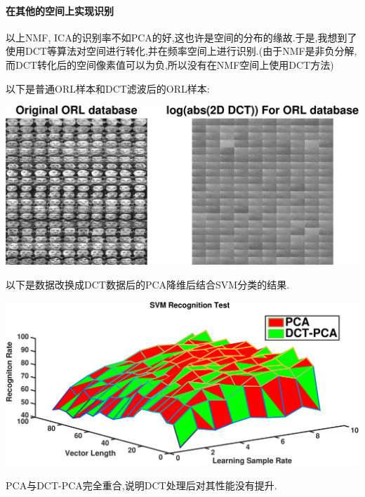 	\paragraph{在其他的空间上实现识别} 以上NMF, ICA的识别率不如PCA的好,这也许是空间的分布的缘故.于是,我想到了使用DCT等算法对空间进行转化,并在频率空间上进行识别.(由于NMF是非负分解,而DCT转化后的空间像素值可以为负,所以没有在NMF空间上使用DCT方法) \newline
	
	以下是普通ORL样本和DCT滤波后的ORL样本:
	
	\begin{center}
	\begin{minipage}[t]{\linewidth}
	\center
	{
	\includegraphics[width=\textwidth]{Img/dct_demo} 
	}
	\end{minipage}
	\medskip
	\end{center}

	以下是数据改换成DCT数据后的PCA降维后结合SVM分类的结果.
	\begin{center}
	\begin{minipage}[t]{\linewidth}
	\center
	{
	\includegraphics[width=\textwidth]{Img/svm_pca_dct} 
	}
	\end{minipage}
	\medskip
	\end{center}
	PCA与DCT-PCA完全重合,说明DCT处理后对其性能没有提升.
	
